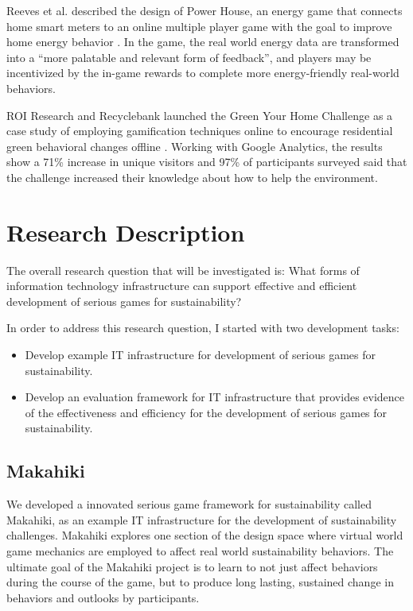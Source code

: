Reeves et al. described the design of Power House, an energy game that connects
home smart meters to an online multiple player game with the goal to improve
home energy behavior \cite{Reeves2011powerhouse}. In the game, the real world
energy data are transformed into a ``more palatable and relevant form of
feedback'', and players may be incentivized by the in-game rewards to complete
more energy-friendly real-world behaviors.

ROI Research and Recyclebank launched the Green Your Home Challenge as a case
study of employing gamification techniques online to
encourage residential green behavioral changes offline \cite{gamingforgood}.
Working with Google Analytics, the results show a 71\% increase in unique
visitors and 97\% of participants surveyed said that the challenge increased
their knowledge about how to help the environment.

\section{Research Description}

The overall research question that will be investigated is:
What forms of information technology infrastructure can support effective and efficient development of serious games for sustainability?

In order to address this research question, I started with two development tasks:
\begin{itemize}
    \item Develop example IT infrastructure for development of serious games for sustainability.

    \item Develop an evaluation framework for IT infrastructure that provides evidence of the effectiveness and efficiency for the development of serious games for sustainability.
\end{itemize}


\subsection{Makahiki}

We developed a innovated serious game framework for sustainability called Makahiki, as an example IT infrastructure for the development of sustainability challenges. Makahiki explores one section of the design space
where virtual world game mechanics are employed to affect real world sustainability
behaviors.  The ultimate goal of the Makahiki project is to learn to
not just affect behaviors during the course of the game, but to
produce long lasting, sustained change in behaviors and
outlooks by participants.

